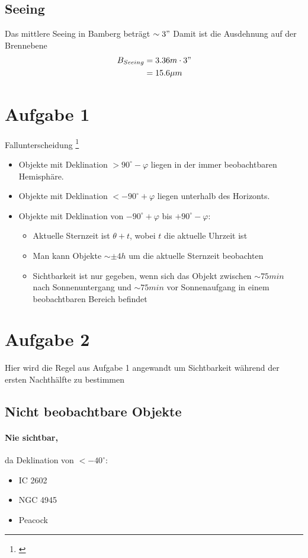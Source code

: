 \documentclass[titlepage]{scrartcl}
\begin{document}
\subsection{Seeing}
Das mittlere Seeing in Bamberg beträgt $\sim3 "$ 
Damit ist die Ausdehnung auf der Brennebene
\begin{align*}
B_{Seeing}&=3.36m \cdot 3"\\
&= 15.6 \mu m
\end{align*}
\section{Aufgabe 1}
\label{aufgabe-1}
Fallunterscheidung \footnote{\cite{kmann}}
\begin{itemize}
\item Objekte mit Deklination  $> 90^\circ - \varphi$ liegen in der immer beobachtbaren Hemisphäre.
\item Objekte mit Deklination $< - 90^\circ + \varphi$ liegen unterhalb des Horizonts.
\item Objekte mit Deklination von $-90^\circ + \varphi$ bis $+90^\circ - \varphi$:
\begin{itemize}
\item Aktuelle Sternzeit ist $\theta + t$, wobei $t$ die aktuelle Uhrzeit ist
\item Man kann Objekte $\sim\pm 4 h$ um die aktuelle Sternzeit beobachten
\item Sichtbarkeit ist nur gegeben, wenn sich das Objekt zwischen $\sim 75 min$ nach Sonnenuntergang und $\sim 75 min$ vor Sonnenaufgang in einem beobachtbaren Bereich befindet
\end{itemize}
\end{itemize}
\section{Aufgabe 2}
Hier wird die Regel aus Aufgabe 1 angewandt um Sichtbarkeit während der ersten Nachthälfte zu bestimmen
\subsection{Nicht beobachtbare Objekte}
\paragraph{Nie sichtbar,} da Deklination von $<-40^\circ$:
\begin{itemize}
\item IC 2602
\item NGC 4945
\item Peacock
\end{itemize}
\end{document}
